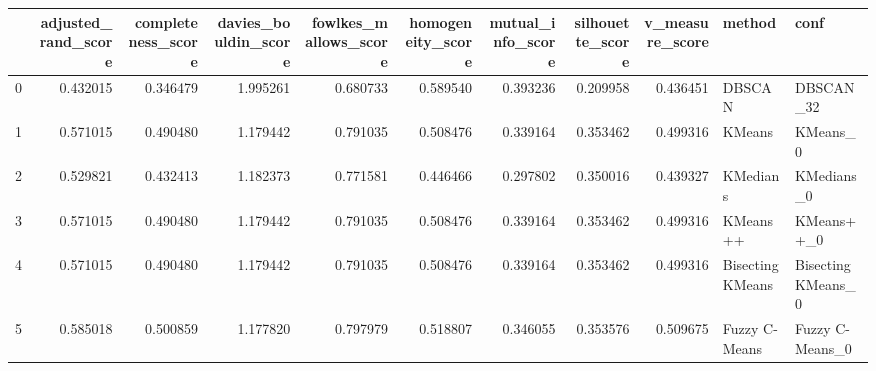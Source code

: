 \begin{tabular}{lrrrrrrrrll}
\toprule
{} &  adjusted\_rand\_score &  completeness\_score &  davies\_bouldin\_score &  fowlkes\_mallows\_score &  homogeneity\_score &  mutual\_info\_score &  silhouette\_score &  v\_measure\_score &            method &                conf \\
\midrule
0 &             0.432015 &            0.346479 &              1.995261 &               0.680733 &           0.589540 &           0.393236 &          0.209958 &         0.436451 &            DBSCAN &           DBSCAN\_32 \\
1 &             0.571015 &            0.490480 &              1.179442 &               0.791035 &           0.508476 &           0.339164 &          0.353462 &         0.499316 &            KMeans &            KMeans\_0 \\
2 &             0.529821 &            0.432413 &              1.182373 &               0.771581 &           0.446466 &           0.297802 &          0.350016 &         0.439327 &          KMedians &          KMedians\_0 \\
3 &             0.571015 &            0.490480 &              1.179442 &               0.791035 &           0.508476 &           0.339164 &          0.353462 &         0.499316 &          KMeans++ &          KMeans++\_0 \\
4 &             0.571015 &            0.490480 &              1.179442 &               0.791035 &           0.508476 &           0.339164 &          0.353462 &         0.499316 &  Bisecting KMeans &  Bisecting KMeans\_0 \\
5 &             0.585018 &            0.500859 &              1.177820 &               0.797979 &           0.518807 &           0.346055 &          0.353576 &         0.509675 &     Fuzzy C-Means &     Fuzzy C-Means\_0 \\
\bottomrule
\end{tabular}

